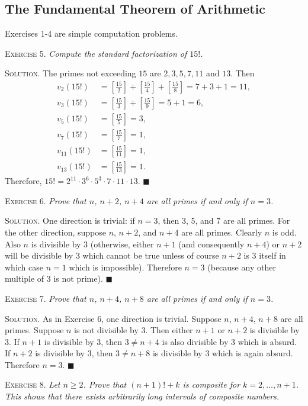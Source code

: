 \documentclass[11pt, leqno]{article}
\newcommand{\done}{\ensuremath{\blacksquare}}
\begin{document}
\subsection{The Fundamental Theorem of Arithmetic}

Exercises 1-4 are simple computation problems.

\textsc{Exercise 5}. \emph{Compute the standard factorization of $15!$.}

\textsc{Solution}. The primes not exceeding $15$ are $2, 3, 5, 7, 11 $ and $13$. Then 
\begin{align*}
  v_2(15!) &= \left[\frac{15}{2}\right] + \left[\frac{15}{4}\right] + \left[\frac{15}{8}\right] = 7 + 3 + 1 = 11, \\
  v_3(15!) &= \left[\frac{15}{3}\right] + \left[\frac{15}{9}\right] = 5 + 1 = 6,\\
  v_5(15!) &= \left[\frac{15}{5}\right] = 3, \\
  v_7(15!) &= \left[\frac{15}{7}\right] = 1, \\
  v_{11}(15!) &= \left[\frac{15}{11}\right] = 1, \\
  v_{13}(15!) &= \left[\frac{15}{13}\right] = 1.
\end{align*}
Therefore, $15! = 2^{11}\cdot 3^6\cdot 5^3\cdot 7 \cdot 11 \cdot 13$. \done

\textsc{Exercise 6}. \emph{Prove that $n$, $n+2$, $n+4$ are all primes if and only if $n=3$.}

\textsc{Solution}. One direction is trivial: if $n=3$, then $3$, $5$, and $7$ are all primes. For the other direction, suppose $n$, $n+2$, and $n+4$ are all primes. Clearly $n$ is odd. Also $n$ is divisible by $3$ (otherwise, either $n+1$ (and consequently $n+4$) or $n+2$ will be divisible by $3$ which cannot be true unless of course $n+2$ is $3$ itself in which case $n=1$ which is impossible). Therefore $n=3$ (because any other multiple of 3 is not prime). \done

\textsc{Exercise 7}. \emph{Prove that $n$, $n+4$, $n+8$ are all primes if and only if $n=3$.}

\textsc{Solution}. As in Exercise 6, one direction is trivial. Suppose $n$, $n+4$, $n+8$ are all primes. Suppose $n$ is not divisible by $3$. Then either $n+1$ or $n+2$ is divisible by $3$. If $n+1$ is divisible by $3$, then $3 \ne n+4$ is also divisible by $3$ which is absurd. If $n+2$ is divisible by $3$, then $3 \ne n+8$ is divisible by $3$ which is again absurd. Therefore $n=3$. \done

\textsc{Exercise 8}. \emph{Let $n \geq 2$. Prove that $(n+1)! + k$ is composite for $k= 2, \ldots, n+1$. This shows that there exists arbitrarily long intervals of composite numbers.}
\end{document}
